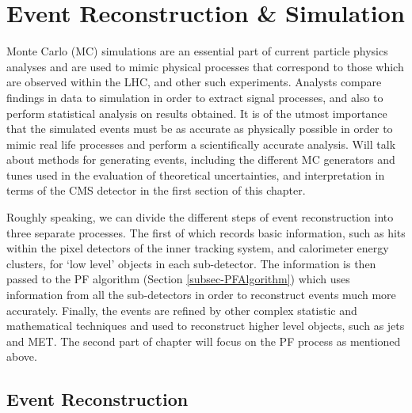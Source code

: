 \chapter{Event Reconstruction \& Simulation} \label{chap-EventReconstruction&Simulation}

Monte Carlo (MC) simulations are an essential part of current particle physics analyses and are used to mimic physical processes that correspond to those which are observed within the LHC, and other such experiments. Analysts compare findings in data to simulation in order to extract signal processes, and also to perform statistical analysis on results obtained. It is of the utmost importance that the simulated events must be as accurate as physically possible in order to mimic real life processes and perform a scientifically accurate analysis. Will talk about methods for generating events, including the different MC generators and tunes used in the evaluation of theoretical uncertainties, and interpretation in terms of the CMS detector in the first section of this chapter.

Roughly speaking, we can divide the different steps of event reconstruction into three separate processes. The first of which records basic information, such as hits within the pixel detectors of the inner tracking system, and calorimeter energy clusters, for `low level' objects in each sub-detector. The information is then passed to the PF algorithm (Section \ref{subsec-PFAlgorithm}) which uses information from all the sub-detectors in order to reconstruct events much more accurately. Finally, the events are refined by other complex statistic and mathematical techniques and used to reconstruct higher level objects, such as jets and MET. The second part of chapter will focus on the PF process \cite{CMS-PAS-PFT-09-001, CMS-PAS-PFT-10-001} as mentioned above.

\section{Event Reconstruction} \label{sec-EventReconstruction}

